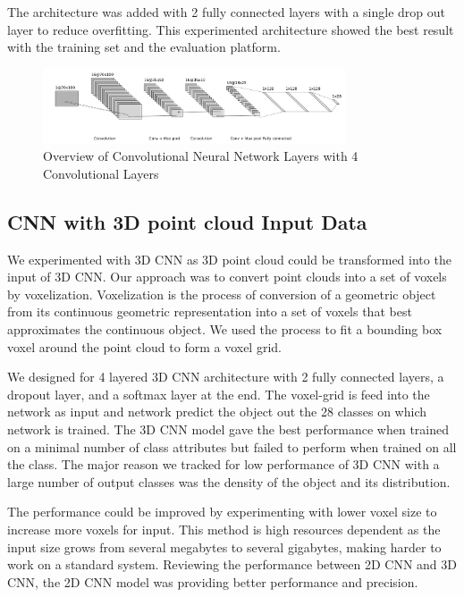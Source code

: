 The architecture was added with 2 fully connected layers with a single drop out layer to reduce overfitting.
This experimented architecture showed the best result with the training set and the evaluation platform.

\begin{figure}[!h]
     \begin{center}
       \includegraphics[width=0.8\textwidth]{./images/object_net.pdf}
       \caption{Overview of Convolutional Neural Network Layers with 4 Convolutional Layers}
       \label{fig:cnn}
     \end{center}
\end{figure}

\subsection{CNN with 3D point cloud Input Data}
We experimented with 3D CNN as 
3D point cloud could be transformed into the input of 3D CNN.
Our approach was to convert point clouds into a set of voxels by voxelization. 
Voxelization is the process of conversion of a geometric object from its continuous geometric representation into a set of voxels that best approximates the continuous
object. We used the process to fit a bounding box voxel around the point cloud to form a voxel grid.

We designed for 4 layered 3D CNN architecture with 2 fully connected layers, a dropout layer, and a softmax layer at the end.
The voxel-grid is feed into the network as input and network predict the object out the 28 classes on which network is trained.
The 3D CNN model gave the best performance when trained on a minimal number of class attributes but failed to perform when trained on all the class.
The major reason we tracked for low performance of 3D CNN with a large number of output classes was the density of the object and its distribution.

The performance could be improved by experimenting with lower voxel size to increase more voxels for input.
This method is high resources dependent as the input size grows from several megabytes to several gigabytes, making harder to work on a standard system.
Reviewing the performance between 2D CNN and 3D CNN, the 2D CNN model was providing better performance and precision.
